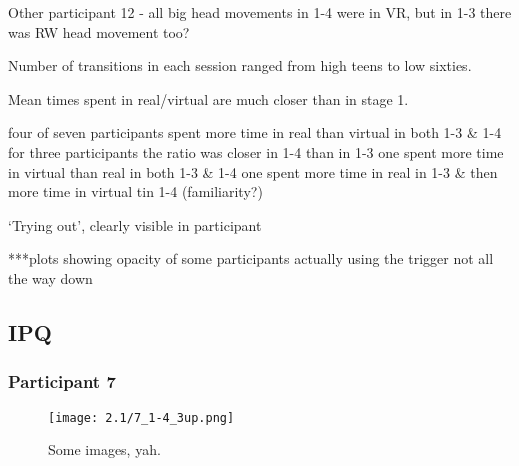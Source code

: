 Other
	participant 12 - all big head movements in 1-4 were in VR, but in 1-3 there was RW head movement too?








Number of transitions in each session ranged from high teens to low sixties.

Mean times spent in real/virtual are much closer than in stage 1.

four of seven participants spent more time in real than virtual in both 1-3 \& 1-4
	for three participants the ratio was closer in 1-4 than in 1-3
	one spent more time in virtual than real in both 1-3 \& 1-4
	one spent more time in real in 1-3 \& then more time in virtual tin 1-4 (familiarity?)
	
`Trying out', clearly visible in participant

***plots showing opacity of some participants actually using the trigger not all the way down



\subsection{IPQ}
















\clearpage

\subsubsection{Participant 7}

\begin{figure}[h]
	\begin{center}
	\texttt{[image: 2.1/7\_1-4\_3up.png]}
	\caption{Some images, yah.}
	\end{center}
\end{figure}

